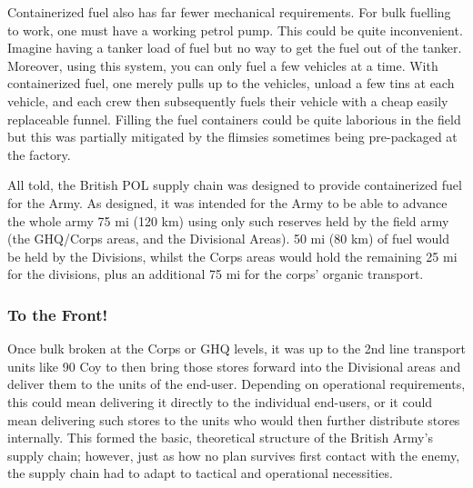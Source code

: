 \documentclass[noraggedright]{turabian-researchpaper}
\newcommand{\SupInWar}{Precis on Lecture ``Supplies in War'', (Part II)}
\begin{document}
Containerized fuel also has far fewer mechanical requirements.  For bulk 
fuelling to work, one must have a working petrol pump.  This could be quite 
inconvenient.  Imagine having a tanker load of fuel but no way to get 
the fuel out of the tanker.  %
Moreover, using this system, you can only fuel a few vehicles at a time.  
With containerized fuel, one merely pulls up to the vehicles, unload a few
tins at each vehicle, and each crew then subsequently fuels their vehicle
with a cheap easily replaceable funnel.  Filling the fuel containers could
be quite laborious in the field but this was partially mitigated by the
flimsies sometimes being pre-packaged at the factory.\autocite[178-9]{feat}



All told, the British POL supply chain was designed to provide containerized
fuel for the Army.  As designed, it was intended for the Army to be able to
advance the whole army 75 mi (120 km) using only such reserves held by the 
field army (the GHQ/Corps areas, and the Divisional Areas).  50 mi (80 km) 
of fuel would be held by the Divisions, whilst the Corps areas would hold
the remaining 25 mi for the divisions, plus an additional 75 mi for the corps'
organic transport.\autocite[\SupInWar][3]{27course}

\subsubsection{To the Front!}

Once bulk broken at the Corps or GHQ levels, it was up to the 2nd
line transport units like 90 Coy to then bring those stores forward into the
Divisional areas and deliver them to the units of the end-user.  Depending on 
operational requirements, this could mean delivering it directly to the 
individual end-users, or it could mean delivering such stores to the units who 
would then further distribute stores internally.  This formed the basic, 
theoretical structure of the British Army's supply chain; however, just as how
no plan survives first contact with the enemy, the supply chain had to adapt
to tactical and operational necessities.  

\end{document}
